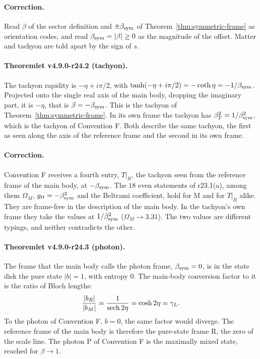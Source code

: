\paragraph{Correction.}
Read \(\beta\) of the sector definition and \(\pm\beta_{\mathrm{sym}}\) of Theorem~\ref{thm:symmetric-frame} as orientation codes, and read
\(\beta_{\mathrm{sym}}=|\beta|\ge0\) as the magnitude of the offset.  Matter and tachyon are told apart by the sign of \(s\).

\paragraph{Theoremlet v4.9.0-r24.2 (tachyon).}
The tachyon rapidity is \(-\eta+i\pi/2\), with \(\tanh(-\eta+i\pi/2)=-\coth\eta=-1/\beta_{\mathrm{sym}}\).  Projected onto the single real axis of the
main body, dropping the imaginary part, it is \(-\eta\), that is \(\beta=-\beta_{\mathrm{sym}}\).  This is the tachyon of
Theorem~\ref{thm:symmetric-frame}.  In its own frame the tachyon has \(\beta_T^2=1/\beta_{\mathrm{sym}}^2\), which is the tachyon of Convention F.
Both describe the same tachyon, the first as seen along the axis of the reference frame and the second in its own frame.

\paragraph{Correction.}
Convention F receives a fourth entry, \(T|_R\), the tachyon seen from the reference frame of the main body, at \(-\beta_{\mathrm{sym}}\).  The \(18\)
even statements of r23.1(a), among them \(\Omega_M\), \(g_{tt}=-\beta_{\mathrm{sym}}^2\) and the Beltrami coefficient, hold for M and for \(T|_R\)
alike.  They are frame-free in the description of the main body.  In the tachyon's own frame they take the values at
\(1/\beta_{\mathrm{sym}}^2\) (\(\Omega_M\to3.31\)).  The two values are different typings, and neither contradicts the other.

\paragraph{Theoremlet v4.9.0-r24.3 (photon).}
The frame that the main body calls the photon frame, \(\beta_{\mathrm{sym}}=0\), is in the state disk the pure state \(|b|=1\), with entropy \(0\).
The main-body conversion factor to it is the ratio of Bloch lengths:
\[
\frac{|b_R|}{|b_M|}=\frac{1}{\operatorname{sech}2\eta}=\cosh2\eta=\gamma_L .
\]
To the photon of Convention F, \(b=0\), the same factor would diverge.  The reference frame of the main body is therefore the
pure-state frame R, the zero of the scale line.  The photon P of Convention F is the maximally mixed state, reached for
\(\beta\to1\).

